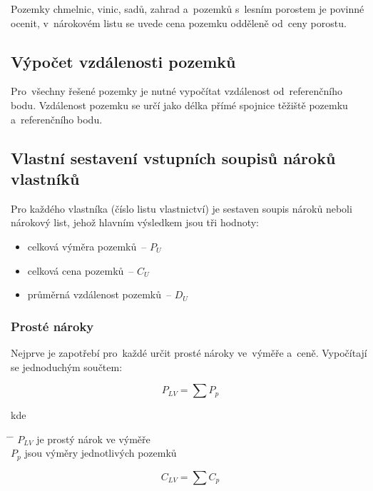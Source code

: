 Pozemky chmelnic, vinic, sadů, zahrad a~pozemků s~lesním porostem je povinné ocenit, v~nárokovém listu se uvede cena pozemku odděleně od~ceny porostu.

\subsection{Výpočet vzdálenosti pozemků}
\label{vypocet_vzdalnosti_pozemku}

Pro~všechny řešené pozemky je nutné vypočítat vzdálenost od~referenčního bodu. Vzdálenost pozemku se určí jako délka přímé spojnice těžiště pozemku a~referenčního bodu.

\subsection{Vlastní sestavení vstupních soupisů nároků vlastníků}
\label{vlastni_naroky}

Pro každého vlastníka (číslo listu vlastnictví) je sestaven soupis nároků neboli náro\-kový list, jehož hlavním výsledkem jsou tři hodnoty:
\vspace{-\topsep}
	\begin{itemize}[leftmargin=1.5cm, noitemsep]
		\item celková výměra pozemků~– $P_{U}$
		\item celková cena pozemků~– $C_{U}$
		\item průměrná vzdálenost pozemků~– $D_{U}$
	\end{itemize}

\subsubsection{Prosté nároky}
\label{proste_naroky}

Nejprve je zapotřebí pro~každé  určit prosté nároky ve~výměře a~ceně. Vypočítají se jednoduchým součtem:

\begin{equation}
	P_{LV} = \sum\nolimits P_{p}
\end{equation}

kde
\begin{tabbing}
\hspace{2em} \= \hspace{5em} \= \kill
	\> $P_{LV}$	\> je prostý nárok ve výměře \\
	\> $P_{p}$	\> jsou výměry jednotlivých pozemků
\end{tabbing}

\begin{equation}
	C_{LV} = \sum\nolimits C_{p}
\end{equation}

